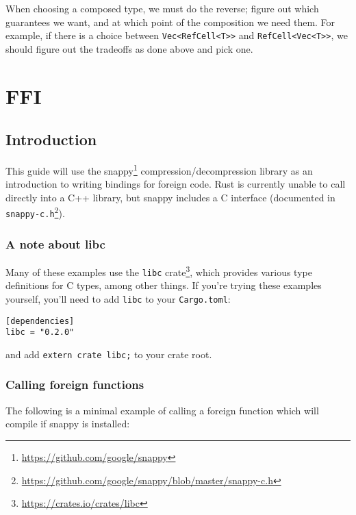 \documentclass[a4paper,]{book}
\renewcommand{\href}[2]{#2\footnote{\url{#1}}}
\begin{document}
When choosing a composed type, we must do the reverse; figure out which
guarantees we want, and at which point of the composition we need them.
For example, if there is a choice between
\texttt{Vec\textless{}RefCell\textless{}T\textgreater{}\textgreater{}}
and
\texttt{RefCell\textless{}Vec\textless{}T\textgreater{}\textgreater{}},
we should figure out the tradeoffs as done above and pick one.

\hypertarget{sec--ffi}{\section{FFI}\label{sec--ffi}}

\subsection{Introduction}\label{introduction-1}

This guide will use the \href{https://github.com/google/snappy}{snappy}
compression/decompression library as an introduction to writing bindings
for foreign code. Rust is currently unable to call directly into a C++
library, but snappy includes a C interface (documented in
\href{https://github.com/google/snappy/blob/master/snappy-c.h}{\texttt{snappy-c.h}}).

\subsubsection{A note about libc}\label{a-note-about-libc}

Many of these examples use \href{https://crates.io/crates/libc}{the
\texttt{libc} crate}, which provides various type definitions for C
types, among other things. If you're trying these examples yourself,
you'll need to add \texttt{libc} to your \texttt{Cargo.toml}:

\begin{verbatim}
[dependencies]
libc = "0.2.0"
\end{verbatim}

and add \texttt{extern\ crate\ libc;} to your crate root.

\subsubsection{Calling foreign
functions}\label{calling-foreign-functions}

The following is a minimal example of calling a foreign function which
will compile if snappy is installed:
\end{document}
